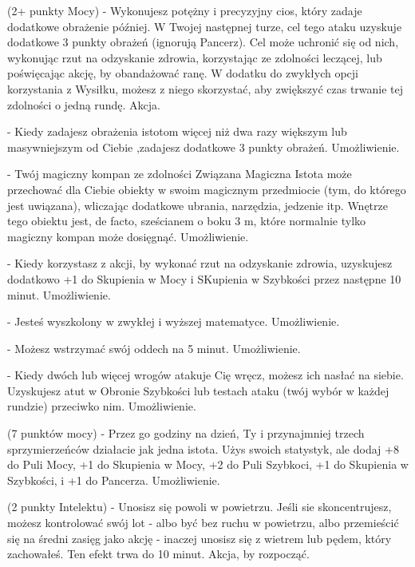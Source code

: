 { (2+ punkty Mocy) - Wykonujesz potężny i precyzyjny cios, który zadaje dodatkowe obrażenie później. W Twojej następnej turze, cel tego ataku uzyskuje dodatkowe 3 punkty obrażeń (ignorują Pancerz). Cel może uchronić się od nich, wykonując rzut na odzyskanie zdrowia, korzystając ze zdolności leczącej, lub poświęcając akcję, by obandażować ranę. W dodatku do zwykłych opcji korzystania z Wysiłku, możesz z niego skorzystać, aby zwiększyć czas trwanie tej zdolności o jedną rundę. Akcja. 

 - Kiedy zadajesz obrażenia istotom więcej niż dwa razy większym lub masywniejszym od Ciebie ,zadajesz dodatkowe 3 punkty obrażeń. Umożliwienie. 

 - Twój magiczny kompan ze zdolności Związana Magiczna Istota może przechować dla Ciebie obiekty w swoim magicznym przedmiocie (tym, do którego jest uwiązana), wliczając dodatkowe ubrania, narzędzia, jedzenie itp. Wnętrze tego obiektu jest, de facto, sześcianem o boku 3 m, które normalnie tylko magiczny kompan może dosięgnąć. Umożliwienie.

 - Kiedy korzystasz z akcji, by wykonać rzut na odzyskanie zdrowia, uzyskujesz dodatkowo +1 do Skupienia w Mocy i SKupienia w Szybkości przez następne 10 minut. Umożliwienie.

 - Jesteś wyszkolony w zwykłej i wyższej matematyce. Umożliwienie.

 - Możesz wstrzymać swój oddech na 5 minut. Umożliwienie.

 - Kiedy dwóch lub więcej wrogów atakuje Cię wręcz, możesz ich nasłać na siebie. Uzyskujesz atut w Obronie Szybkości lub testach ataku (twój wybór w każdej rundzie) przeciwko nim. Umożliwienie.

 (7 punktów mocy) - Przez go godziny na dzień, Ty i przynajmniej trzech sprzymierzeńców działacie jak jedna istota. Użys swoich statystyk, ale dodaj +8 do Puli Mocy, +1 do Skupienia w Mocy, +2 do Puli Szybkoci, +1 do Skupienia w Szybkości, i +1 do Pancerza. Umożliwienie. 

 (2 punkty Intelektu) - Unosisz się powoli w powietrzu. Jeśli sie skoncentrujesz, możesz kontrolować swój lot - albo być bez ruchu w powietrzu, albo przemieścić się na średni zasięg jako akcję - inaczej unosisz się z wietrem lub pędem, który zachowałeś. Ten efekt trwa do 10 minut. Akcja, by rozpocząć. 

}

